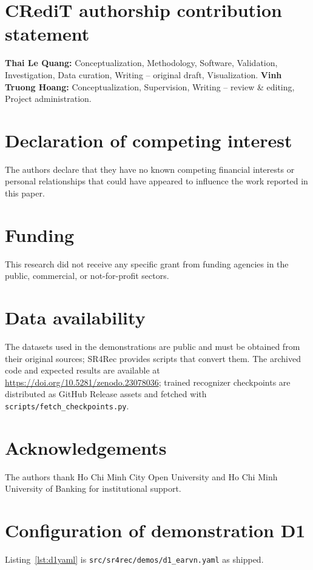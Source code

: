 \documentclass[preprint,12pt]{elsarticle}
\begin{document}
\section*{CRediT authorship contribution statement}
\textbf{Thai Le Quang:} Conceptualization, Methodology, Software, Validation, Investigation, Data curation, Writing -- original draft, Visualization.
\textbf{Vinh Truong Hoang:} Conceptualization, Supervision, Writing -- review \& editing, Project administration.

\section*{Declaration of competing interest}
The authors declare that they have no known competing financial interests or personal relationships
that could have appeared to influence the work reported in this paper.

\section*{Funding}
This research did not receive any specific grant from funding agencies in the public, commercial,
or not-for-profit sectors.

\section*{Data availability}
The datasets used in the demonstrations are public and must be obtained from their original
sources; SR4Rec provides scripts that convert them. The archived code and expected results are
available at \url{https://doi.org/10.5281/zenodo.23078036}; trained recognizer checkpoints are
distributed as GitHub Release assets and fetched with \texttt{scripts/fetch\_checkpoints.py}.

\section*{Acknowledgements}
The authors thank Ho Chi Minh City Open University and Ho Chi Minh University of Banking for institutional support.

\FloatBarrier
\appendix
\setcounter{table}{0}
\setcounter{figure}{0}
\renewcommand{\theHtable}{A\arabic{table}}
\renewcommand{\theHfigure}{A\arabic{figure}}

\section{Configuration of demonstration D1}
\label{app:config}
Listing~\ref{lst:d1yaml} is \texttt{src/sr4rec/demos/d1\_earvn.yaml} as shipped.
\end{document}
